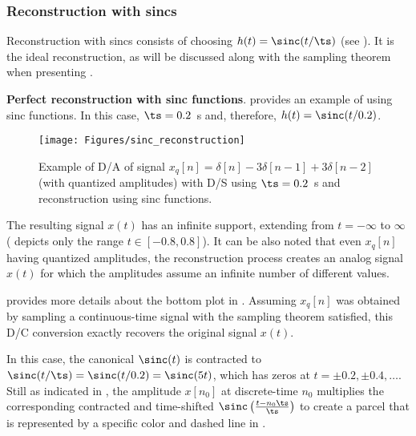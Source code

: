 \subsubsection{Reconstruction with sincs}
\label{sec:rec_with_sincs}

Reconstruction with sincs consists of choosing $h(t) = \sinc(t / \ts)$ (see ).
It is the ideal reconstruction, as will be discussed along with the sampling theorem when presenting .

\bExample \textbf{Perfect reconstruction with sinc functions}.
 provides an example of  using sinc functions. In this case, $\ts=0.2$~s and, therefore, $h(t)=\sinc(t/0.2)$.


\begin{figure}
	\centering
		\texttt{[image: Figures/sinc\_reconstruction]}
	\caption{Example of D/A of signal $x_q[n]=\delta[n]-3\delta[n-1]+3\delta[n-2]$ (with quantized amplitudes) with D/S using $\ts=0.2$~s and reconstruction using sinc functions.\label{fig:sinc_reconstruction}}
\end{figure}

The resulting signal $x(t)$ has an infinite support, extending from $t=-\infty$ to $\infty$ ( depicts only the range $t \in [-0.8, 0.8]$).
It can be also noted that even $x_q[n]$
having quantized amplitudes, the reconstruction process creates an analog signal $x(t)$ for which the amplitudes
assume an infinite number of different values.

 provides more details about the bottom plot in . 
Assuming $x_q[n]$ was obtained by sampling a continuous-time signal with the sampling theorem satisfied, this D/C conversion exactly recovers the original signal $x(t)$.

In this case, the canonical $\sinc(t)$ is contracted to $\sinc(t/\ts) = \sinc(t/0.2) = \sinc(5t)$, which has zeros at $t= \pm 0.2, \pm 0.4, \ldots$.
Still as indicated in , 
 the amplitude $x[n_0]$ at discrete-time $n_0$ 
multiplies the corresponding contracted and time-shifted $\sinc \left( \frac{t-n_0 \ts}{\ts}\right)$ to create a parcel that is represented by a specific color and dashed line in .

